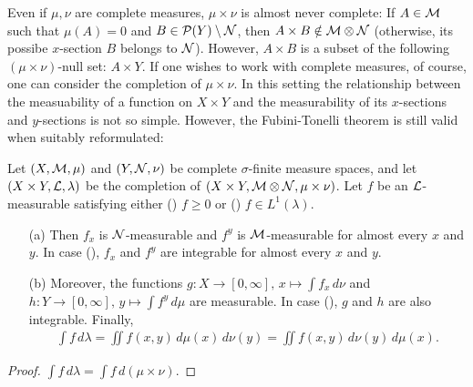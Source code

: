 Even if $\mu, \nu$ are complete measures, $\mu\times\nu$ is almost never complete:
If $A\in{\mathcal{M}}$ such that $\mu(A)=0$ and $B\in{\mathcal{P}}(Y)\setminus{\mathcal{N}}$, then $A\times B\notin{\mathcal{M}}\otimes{\mathcal{N}}$ (otherwise, its possibe $x$-section $B$ belongs to ${\mathcal{N}}$).
However, $A\times B$ is a subset of the following $(\mu\times\nu)$-null set: $A\times Y$.
If one wishes to work with complete measures, of course, one can consider the completion of $\mu\times\nu$.
In this setting the relationship between the measuability of a function on $X\times Y$ and the measurability of its $x$-sections and $y$-sections is not so simple.
However, the Fubini-Tonelli theorem is still valid when suitably reformulated:
\begin{thm}
    Let $(X, {\mathcal{M}}, \mu)$ and $(Y, {\mathcal{N}}, \nu)$ be complete $\sigma$-finite measure spaces, and let $(X\times Y, {\mathcal{L}}, \lambda)$ be the completion of $(X\times Y, {\mathcal{M}}\otimes{\mathcal{N}}, \mu\times\nu)$.
    Let $f$ be an ${\mathcal{L}}$-measurable satisfying either () $f\geq 0$ or () $f\in L^1(\lambda)$.
    \begin{enumerate}
        \item[(a)]
        {
            Then $f_x$ is ${\mathcal{N}}$-measurable and $f^y$ is ${\mathcal{M}}$-measurable for almost every $x$ and $y$.
            In case (), $f_x$ and $f^y$ are integrable for almost every $x$ and $y$.
        }
        \item[(b)]
        {
            Moreover, the functions $g: X\rightarrow[0, \infty],\,x\mapsto \int f_x\,d\nu$ and $h: Y\rightarrow[0, \infty],\,y\mapsto \int f^y\,d\mu$ are measurable.
            In case (), $g$ and $h$ are also integrable.
            Finally,
            \begin{align*}
                \int f\,d\lambda=\iint f(x, y)\,d\mu(x)\,d\nu(y)=\iint f(x, y)\,d\nu(y)\,d\mu(x).
            \end{align*}
        }
    \end{enumerate}
\end{thm}
\ifinclude
\begin{proof}
    $\int f\,d\lambda=\int f\,d(\mu\times\nu)$.
\end{proof}
\else
